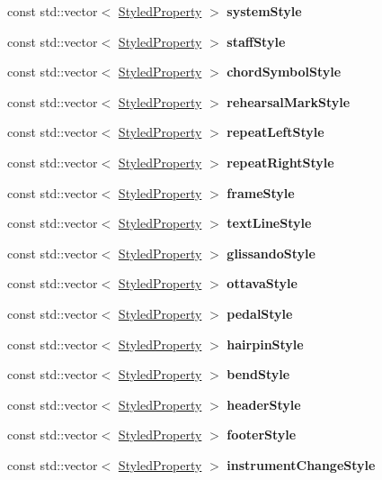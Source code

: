 \begin{DoxyCompactItemize}
\item 
const std\+::vector$<$ \hyperlink{struct_ms_1_1_styled_property}{Styled\+Property} $>$ {\bfseries system\+Style}
\item 
const std\+::vector$<$ \hyperlink{struct_ms_1_1_styled_property}{Styled\+Property} $>$ {\bfseries staff\+Style}
\item 
const std\+::vector$<$ \hyperlink{struct_ms_1_1_styled_property}{Styled\+Property} $>$ {\bfseries chord\+Symbol\+Style}
\item 
const std\+::vector$<$ \hyperlink{struct_ms_1_1_styled_property}{Styled\+Property} $>$ {\bfseries rehearsal\+Mark\+Style}
\item 
const std\+::vector$<$ \hyperlink{struct_ms_1_1_styled_property}{Styled\+Property} $>$ {\bfseries repeat\+Left\+Style}
\item 
const std\+::vector$<$ \hyperlink{struct_ms_1_1_styled_property}{Styled\+Property} $>$ {\bfseries repeat\+Right\+Style}
\item 
const std\+::vector$<$ \hyperlink{struct_ms_1_1_styled_property}{Styled\+Property} $>$ {\bfseries frame\+Style}
\item 
const std\+::vector$<$ \hyperlink{struct_ms_1_1_styled_property}{Styled\+Property} $>$ {\bfseries text\+Line\+Style}
\item 
const std\+::vector$<$ \hyperlink{struct_ms_1_1_styled_property}{Styled\+Property} $>$ {\bfseries glissando\+Style}
\item 
const std\+::vector$<$ \hyperlink{struct_ms_1_1_styled_property}{Styled\+Property} $>$ {\bfseries ottava\+Style}
\item 
const std\+::vector$<$ \hyperlink{struct_ms_1_1_styled_property}{Styled\+Property} $>$ {\bfseries pedal\+Style}
\item 
const std\+::vector$<$ \hyperlink{struct_ms_1_1_styled_property}{Styled\+Property} $>$ {\bfseries hairpin\+Style}
\item 
const std\+::vector$<$ \hyperlink{struct_ms_1_1_styled_property}{Styled\+Property} $>$ {\bfseries bend\+Style}
\item 
const std\+::vector$<$ \hyperlink{struct_ms_1_1_styled_property}{Styled\+Property} $>$ {\bfseries header\+Style}
\item 
const std\+::vector$<$ \hyperlink{struct_ms_1_1_styled_property}{Styled\+Property} $>$ {\bfseries footer\+Style}
\item 
const std\+::vector$<$ \hyperlink{struct_ms_1_1_styled_property}{Styled\+Property} $>$ {\bfseries instrument\+Change\+Style}

\end{DoxyCompactItemize}
